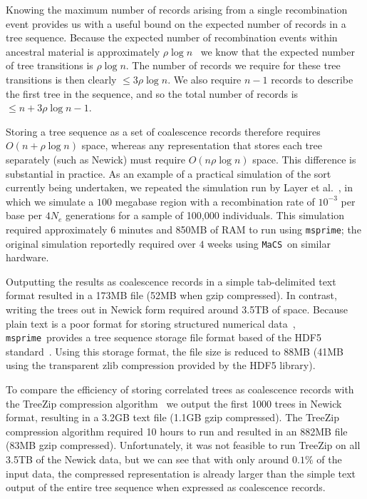 \documentclass[10pt,letterpaper]{article}
\newcommand{\msprime}[0]{\texttt{msprime}}
\newcommand{\MaCS}[0]{\texttt{MaCS}}
\begin{document}
Knowing the maximum number of records arising from a single recombination event
provides us with a useful bound on the expected number of records in a tree
sequence. Because the expected number of recombination events within ancestral
material is approximately $\rho \log n$~\citep{hk85,wh99} we know that
the expected number of tree transitions is $\rho \log n$. The number of records we
require for these tree transitions is then clearly $\leq 3 \rho \log n$. We
also require $n - 1$ records to describe the first tree in the sequence, and so
the total number of records is $\leq n + 3 \rho \log n - 1$.

Storing a tree sequence as a set of coalescence records therefore requires $O(n
+ \rho\log n)$ space, whereas any representation that stores each tree
separately (such as Newick) must require $O(n \rho \log n)$ space. This
difference is substantial in practice. As an example of a practical simulation
of the sort currently being undertaken, we repeated the simulation run
by Layer et al.~\citep{lkkq15}, in which we simulate a $100$ megabase region with a
recombination rate of $10^{-3}$ per base per $4N_e$ generations for a sample of
100,000 individuals. This simulation required approximately $6$ minutes and
850MB of RAM to run using \msprime; the original simulation reportedly required
over $4$ weeks using \MaCS\ on similar hardware.

Outputting the results as coalescence records in a simple tab-delimited text
format resulted in a 173MB file (52MB when gzip compressed). In contrast,
writing the trees out in Newick form required around 3.5TB of space.  Because plain
text is a poor format for storing structured numerical data~\citep{knh13},
\msprime\ provides a tree sequence storage file format based of the HDF5
standard~\citep{hdf5}.  Using this storage format, the file size is reduced to
88MB (41MB using the transparent zlib compression provided by the HDF5 library).

To compare the efficiency of storing correlated trees as coalescence records
with the TreeZip compression algorithm~\citep{msw10} we output the first
1000 trees in Newick format, resulting in a 3.2GB text file (1.1GB gzip
compressed). The TreeZip compression algorithm required 10 hours to run
and resulted in an 882MB file (83MB gzip compressed). Unfortunately,
it was not feasible to run TreeZip on all 3.5TB of the Newick data,
but we can see that with only around $0.1\%$ of the input data, the
compressed representation is already larger than the simple text output
of the entire tree sequence when expressed as coalescence records.
\end{document}

